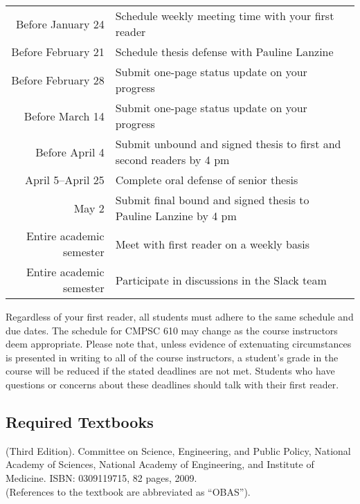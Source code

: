 \begin{center}
\begin{tabular}{r|l}
\hline

Before January 24   & Schedule weekly meeting time with your first reader \\
Before February 21  & Schedule thesis defense with Pauline Lanzine \\
Before February 28  & Submit one-page status update on your progress \\
Before March 14     & Submit one-page status update on your progress \\
Before April 4      & Submit unbound and signed thesis to first and second readers by 4 pm \\
April 5--April 25   & Complete oral defense of senior thesis \\
May 2               & Submit final bound and signed thesis to Pauline Lanzine by 4 pm\\

\hline
Entire academic semester & Meet with first reader on a weekly basis \\
Entire academic semester & Participate in discussions in the Slack team \\
\hline
\end{tabular}
\end{center}

\noindent Regardless of your first reader, all students must adhere to the same schedule and due dates. The schedule for
CMPSC 610 may change as the course instructors deem appropriate. Please note that, unless evidence of extenuating
circumstances is presented in writing to all of the course instructors, a student's grade in the course will be reduced
if the stated deadlines are not met. Students who have questions or concerns about these deadlines should talk with
their first reader.

\vspace{-.15in}
\subsection*{Required Textbooks}
\vspace{-.05in}

 (Third Edition). Committee on Science,
Engineering, and Public Policy, National Academy of Sciences, National Academy of Engineering, and Institute of
Medicine. ISBN: 0309119715, 82 pages, 2009.\\ (References to the textbook are abbreviated as ``OBAS'').

